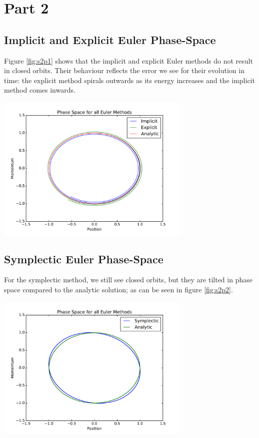 \documentclass{article}
\newenvironment{Figure}
  {\par\medskip\noindent\minipage{\linewidth}}
  {\endminipage\par\medskip}
\begin{document}
\section{Part 2}
\subsection{Implicit and Explicit Euler Phase-Space}

Figure \ref{fig:s2p1} shows that the implicit and explicit Euler methods do not result in closed orbits. Their behaviour reflects the error we see for their evolution in time: the explicit method spirals outwards as its energy increases and the implicit method comes inwards.

\begin{Figure}
\centering
\includegraphics[width=0.7\textwidth]{images/Sec2Plt1.pdf}
\label{fig:s2p1}
\end{Figure}

\subsection{Symplectic Euler Phase-Space}

For the symplectic method, we still see closed orbits, but they are tilted in phase space compared to the analytic solution; as can be seen in figure \ref{fig:s2p2}.

\begin{Figure}
\centering
\includegraphics[width=0.7\textwidth]{images/Sec2Plt2.pdf}
\label{fig:s2p2}
\end{Figure}
\end{document}
